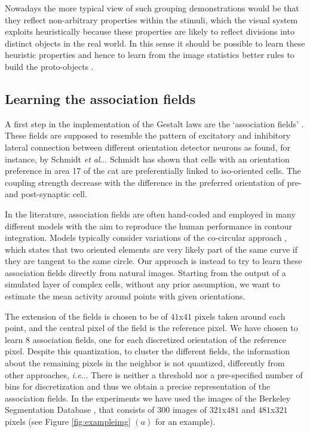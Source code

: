 \documentclass{llncs}
\makeatletter
\DeclareRobustCommand\onedot{\futurelet\@let@token\@onedot}
\def\@onedot{\ifx\@let@token.\else.\null\fi\xspace}
\def\ie{\emph{i.e}\onedot} \def\Ie{\emph{I.e}\onedot}
\def\etal{\emph{et al}\onedot}
\makeatother
\begin{document}
Nowadays the more typical view of such grouping
demonstrations would be that they reflect non-arbitrary properties within the stimuli,
which the visual system exploits heuristically because these properties
are likely to reflect divisions into distinct objects in the real world.
In this sense it should be possible to learn these heuristic
properties and hence to learn from the image statistics better rules
to build the proto-objects \cite{PalmerR94}.


\subsection{Learning the association fields}
A first step in the implementation of the Gestalt laws are the `association fields'
\cite{FieldHH93}. These fields are supposed to resemble the pattern of
excitatory and inhibitory lateral connection between different orientation
detector neurons as found, for instance, by Schmidt \etal \cite{SchmidtGLS97}.
Schmidt has shown that cells with an orientation preference in area
17 of the cat are preferentially linked to iso-oriented cells. The coupling 
strength decrease with the difference in the preferred
orientation of pre- and post-synaptic cell.

In the literature, association fields are often hand-coded and employed in
many different models with the aim to reproduce the human performance in
contour integration. Models typically consider variations of the co-circular
approach \cite{Grossberg85,Guy96,Li98}, which states that two oriented elements are
very likely part of the same curve if they are tangent to the same circle.
Our approach is instead to try to learn these
association fields directly from natural images. 
Starting from the output of a simulated layer of complex cells,
without any prior assumption, we want to estimate the mean
activity around points with given orientations.

The extension of the fields is chosen to be of $41$x$41$ pixels
taken around each point, and the central pixel of the field is the reference pixel.
We have chosen to learn $8$ association fields, one for each discretized
orientation of the reference pixel.
Despite this quantization, to cluster the different fields, the information
about the remaining pixels in the neighbor is not quantized, differently from
other approaches, \ie \cite{Sigman01}.
There is neither a threshold nor a pre-specified number of bins for
discretization and thus we obtain a precise representation of the association fields.
In the experiments we have used the images of the Berkeley Segmentation
Database \cite{MartinFTM01}, that consists of $300$
images of $321$x$481$ and $481$x$321$ pixels
(see Figure \ref{fig:exampleimg} $(a)$ for an example).
\end{document}
